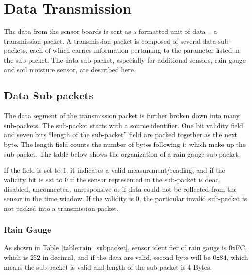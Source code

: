 \section{Data Transmission} \label{section:overall}

The data from the sensor boards is sent as a formatted unit of data -- a transmission
packet. A transmission packet is composed of several data sub-packets, each
of which carries information pertaining to the parameter listed in the sub-packet.
The data sub-packet, especially for additional sensors, rain gauge and soil moisture sensor, are described here.

\subsection{Data Sub-packets} \label{ssec:sub-pack}

The data segment of the transmission packet is further broken down into many
sub-packets. The sub-packet starts with a source identifier. One bit
validity field and seven bits ``length of the sub-packet'' field
are packed together as the next byte. The length field counts the number of
bytes following it which make up the sub-packet. The table below shows the organization
of a rain gauge sub-packet. 
\par
If the field is set to 1, it indicates a valid measurement/reading, 
and if the validity bit is set to 0 if the sensor represented in the sub-packet
is dead, disabled, unconnected, unresponsive or if data could not be collected
from the sensor in the time window. If the validity is 0, the particular invalid sub-packet is not packed into a transmission packet.

\subsubsection{Rain Gauge}
As shown in Table \ref{table:rain_subpacket}, sensor identifier of rain gauge is 0xFC, which is 252 in decimal, and if the data are valid, second byte will be 0x84, which means the sub-packet is valid and length of the sub-packet is 4 Bytes.


\begin{table}[H]
    \caption{Sub-packet for rain gauge}
    \label{table:rain_subpacket}
\end{table}


